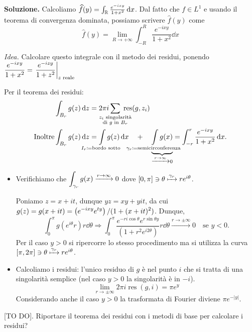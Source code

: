 \textbf{Soluzione.}
Calcoliamo $\widehat{f}(y) = \int_\mathbb R \frac{e^{-ixy}}{1 + x^2} \,\mathrm{d} x$.
Dal fatto che $f \in L^1$ e usando il teorema di convergenza dominata, possiamo scrivere $\hat{f}(y)$ come
%
$$
	\hat{f}(y) = \lim_{R \to +\infty} \int_{-R}^R \frac{e^{-ixy}}{1 + x^2} \dd x
$$
%

\begin{wrapfigure}{r}{0.4\textwidth}
	\centering
	\vspace{-1cm}
	\vspace{-5cm}
\end{wrapfigure}



\textit{Idea.} Calcolare questo integrale con il metodo dei residui, ponendo $\displaystyle \frac{e^{-ixy}}{1 + x^2} = \left. \frac{e^{-izy}}{1 + z^2} \right|_{z \text{ reale}}$

Per il teorema dei residui:
\begin{align*}
	& \int_{B_r} g(z) \dd z = 2\pi i \sum_{\mathclap{\substack{z_i \text{ singolarità} \\ \text{di } g \text{ in } B_r}}} \; \operatorname{res} (g,z_i) \\
	\text{Inoltre} &
	\int_{B_r} g(z) \dd z = \int\limits_{\mathclap{I_r \coloneqq \text{bordo  sotto}}} g(z) \dd x \quad 
	+ \quad \underbrace{\int\limits_{\mathclap{\gamma_r \coloneqq \text{semicirconferenza}}} g(x)}_{\xrightarrow{r \to \infty} 0}
	= \int_{-r}^{r} \frac{e^{-ixy}}{1 + x^2} \dd x.
\end{align*}

\begin{itemize}

	\item Verifichiamo che $\displaystyle \int_{\gamma_r} g(x) \xrightarrow{r \to \infty} 0$ dove $[0,\pi] \ni \theta \xmapsto{\gamma_r} r e^{i\theta}$.

	Poniamo $z = x + it$, dunque $yz = xy + yit$, da cui $\displaystyle g(z) = g(x + it) = \left( e^{-ixy} e^{ty} \right) / (1 + (x + it)^2)$.
	Dunque,
	$$
		\int_0^\pi g(e^{i\theta}r) r \dd \theta
		\Longrightarrow \int_0^\pi \frac{e^{-ri\cos \theta} e^{r \sin\theta y}}{(1 + r^2 e^{i2\theta})} r \dd \theta
		\xrightarrow{r \to \pm \infty} 0 \quad \text{se } y < 0. 
	$$
	Per il caso $y > 0$ si ripercorre lo stesso procedimento ma si utilizza la curva $[\pi,2\pi] \ni \theta \xmapsto{\gamma_r} r e^{i\theta}$.


	\item Calcoliamo i residui: l'unico residuo di $g$ è nel punto $i$ che si tratta di una singolarità semplice (nel caso $y > 0$ la singolarità è in $-i$).
	$$
		\lim_{r \to \pm \infty} 2\pi i \operatorname{res}(g,i) = \pi e^{y}
	$$
	Considerando anche il caso $y > 0$ la trasformata di Fourier diviene $\pi e^{-|y|}$.

\end{itemize}

[TO DO]. Riportare il teorema dei residui con i metodi di base per calcolare i residui?
